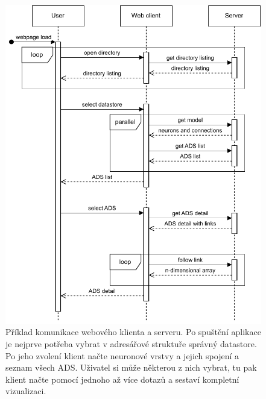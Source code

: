 \begin{figure}
  \centering
  \includegraphics[width=.7\linewidth]{img/ads_sequence.pdf}
  \caption{Příklad komunikace webového klienta a serveru. Po spuštění aplikace je nejprve potřeba vybrat v adresářové struktuře správný datastore. Po jeho zvolení klient načte neuronové vrstvy a jejich spojení a seznam všech ADS. Uživatel si může některou z nich vybrat, tu pak klient načte pomocí jednoho až více dotazů a sestaví kompletní vizualizaci.}
\end{figure}
